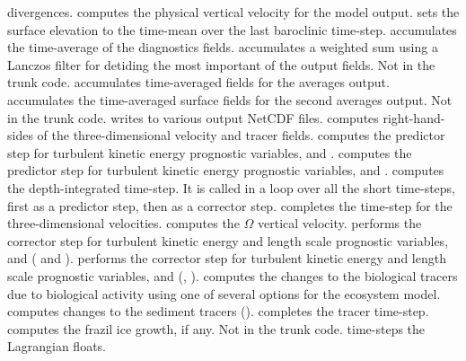 \begin{klist}
  divergences.
   computes the physical vertical velocity for the
  model output.
   sets the surface elevation to the time-mean over the
  last baroclinic time-step.
   accumulates the time-average of the diagnostics
  fields.
   accumulates a weighted sum using a Lanczos filter
  for detiding the most important of the output fields. Not in the trunk
  code.
   accumulates time-averaged fields for the averages
  output.
   accumulates the time-averaged surface fields for the
  second averages output. Not in the trunk code.
   writes to various output NetCDF files.
   computes right-hand-sides of the three-dimensional
  velocity and tracer fields.
   computes the predictor step for turbulent
  kinetic energy prognostic variables,  and .
   computes the predictor step for turbulent
  kinetic energy prognostic variables,  and .
   computes the depth-integrated time-step. It is called in
  a loop over all the short time-steps, first as a predictor step, then
  as a corrector step.
   completes the time-step for the three-dimensional
  velocities.
   computes the $\Omega$ vertical velocity.
   performs the corrector step for turbulent kinetic
  energy and length scale prognostic variables,  and 
  (\cite{Mellor82} and \cite{Galperin88}).
   performs the corrector step for turbulent kinetic
  energy and length scale prognostic variables,  and 
  (\cite{Umlauf2003}, \cite{Warner_2005}).
   computes the changes to the biological tracers due to
  biological activity using one of several options for the ecosystem
  model.
   computes changes to the sediment tracers
  (\cite{Warner_2008}).
   completes the tracer time-step.
   computes the frazil ice growth, if any. Not in the
  trunk code.
   time-steps the Lagrangian floats.
\end{klist}

